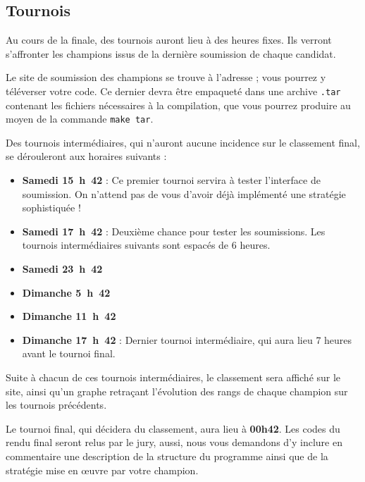 \subsection{Tournois}

Au cours de la finale, des tournois auront lieu à des heures
fixes. Ils verront s'affronter les champions issus de la dernière
soumission de chaque candidat.

Le site de soumission des champions se trouve à l'adresse
\href{http://concours/} ; vous pourrez y téléverser votre code. Ce
dernier devra être empaqueté dans une archive \texttt{.tar} contenant
les fichiers nécessaires à la compilation, que vous pourrez produire
au moyen de la commande \texttt{make tar}.

Des tournois intermédiaires, qui n'auront aucune incidence sur le
classement final, se dérouleront aux horaires suivants :
\begin{itemize} %
\item \textbf{Samedi 15~h~42} : Ce premier tournoi servira à tester
  l'interface de soumission. On n'attend pas de vous d'avoir déjà
  implémenté une stratégie sophistiquée !
\item \textbf{Samedi 17~h~42} : Deuxième chance pour tester les
  soumissions. Les tournois intermédiaires suivants sont espacés de 6
  heures.
\item \textbf{Samedi 23~h~42}
\item \textbf{Dimanche 5~h~42}
\item \textbf{Dimanche 11~h~42}
\item \textbf{Dimanche 17~h~42} : Dernier tournoi intermédiaire, qui
  aura lieu 7 heures avant le tournoi final.
\end{itemize}

Suite à chacun de ces tournois intermédiaires, le classement sera
affiché sur le site, ainsi qu'un graphe retraçant l'évolution des
rangs de chaque champion sur les tournois précédents.

Le tournoi final, qui décidera du classement, aura lieu à
\textbf{00h42}. Les codes du rendu final seront relus par le jury,
aussi, nous vous demandons d'y inclure en commentaire une description
de la structure du programme ainsi que de la stratégie mise en œuvre
par votre champion.

